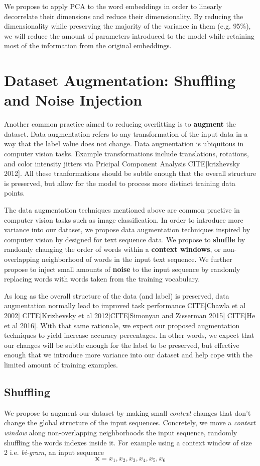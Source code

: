 We propose to apply PCA to the word embeddings in order to linearly decorrelate their dimensions and reduce their dimensionality.
By reducing the dimensionality while preserving the majority of the variance in them (e.g. 95\%), we will reduce the amount of parameters introduced
to the model while retaining most of the information from the original embeddings.



\section{Dataset Augmentation: Shuffling and Noise Injection}
Another common practice aimed to reducing overfitting is to \textbf{augment} the dataset.
Data augmentation refers to any transformation of the input data in a way that
the label value does not change. Data augmentation is ubiquitous in computer vision tasks. Example transformations include translations,
rotations, and color intensity jitters via Pricipal Component Analysis CITE[krizhevsky 2012]. All these tranformations should be subtle enough that the overall structure is preserved, but
allow for the model to process more distinct training data points.

The data augmentation techniques mentioned above are common practive in computer vision tasks such as image classification.
In order to introduce more variance into our dataset, we propose data augmentation techniques inspired by computer vision by designed for
text sequence data.
We propose to \textbf{shuffle} by randomly changing the order of words within a \textbf{context windows}, or non-overlapping neighborhood of words
in the input text sequence.
We further propose to inject small amounts of \textbf{noise} to the input sequence by randomly replacing words with words taken from the training vocabulary.

As long as the overall structure of the data (and label) is preserved, data augmentation normally lead to improved task performance CITE[Chawla et al 2002]
CITE[Krizhevsky et al 2012]CITE[Simonyan and Zisserman 2015] CITE[He et al 2016].
With that same rationale, we expect our proposed augmentation techniques to yield increase accuracy percentages. In other words, we expect that
our changes will be subtle enough for the label to be preserved, but effective enough that we introduce more variance into our dataset and help cope with
the limited amount of training examples.


\subsection{Shuffling}
We propose to augment our dataset by making small \textit{context} changes that don't change the global structure
of the input sequences. Concretely, we move a \textit{context window} along non-overlapping neighborhoods the input sequence, randomly
shuffling the words indexes inside it. For example using a context window of size 2 i.e. \textit{bi-gram}, an input sequence
\[\bm{x} = x_1, x_2, x_3, x_4, x_5, x_6\]

